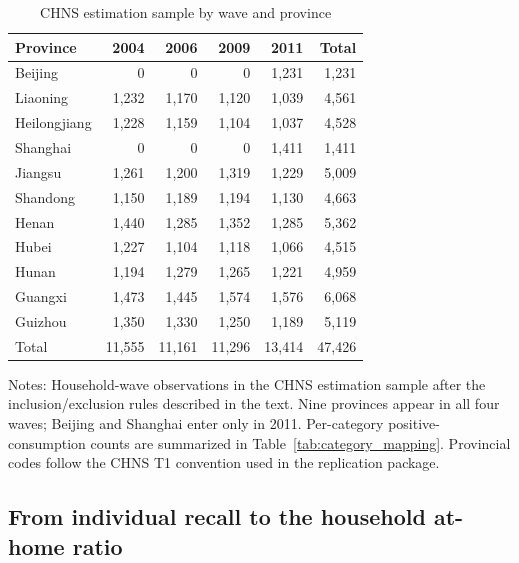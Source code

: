 \documentclass[preprint,12pt,authoryear]{elsarticle}
\begin{document}
\begin{table}[htbp]
\centering
\caption{CHNS estimation sample by wave and province}
\label{tab:sample}
\begin{threeparttable}
\begin{tabular*}{\textwidth}{@{\extracolsep{\fill}} lrrrrr @{}}
\toprule
Province & 2004 & 2006 & 2009 & 2011 & Total \\
\midrule
Beijing       &       0 &       0 &       0 &  1{,}231 &  1{,}231 \\
Liaoning      &  1{,}232 &  1{,}170 &  1{,}120 &  1{,}039 &  4{,}561 \\
Heilongjiang  &  1{,}228 &  1{,}159 &  1{,}104 &  1{,}037 &  4{,}528 \\
Shanghai      &       0 &       0 &       0 &  1{,}411 &  1{,}411 \\
Jiangsu       &  1{,}261 &  1{,}200 &  1{,}319 &  1{,}229 &  5{,}009 \\
Shandong      &  1{,}150 &  1{,}189 &  1{,}194 &  1{,}130 &  4{,}663 \\
Henan         &  1{,}440 &  1{,}285 &  1{,}352 &  1{,}285 &  5{,}362 \\
Hubei         &  1{,}227 &  1{,}104 &  1{,}118 &  1{,}066 &  4{,}515 \\
Hunan         &  1{,}194 &  1{,}279 &  1{,}265 &  1{,}221 &  4{,}959 \\
Guangxi       &  1{,}473 &  1{,}445 &  1{,}574 &  1{,}576 &  6{,}068 \\
Guizhou       &  1{,}350 &  1{,}330 &  1{,}250 &  1{,}189 &  5{,}119 \\
\midrule
Total         & 11{,}555 & 11{,}161 & 11{,}296 & 13{,}414 & 47{,}426 \\
\bottomrule
\end{tabular*}
\begin{tablenotes}[flushleft]
\scriptsize
\item Notes: Household-wave observations in the CHNS estimation sample after the inclusion/exclusion rules described in the text. Nine provinces appear in all four waves; Beijing and Shanghai enter only in 2011. Per-category positive-consumption counts are summarized in Table~\ref{tab:category_mapping}. Provincial codes follow the CHNS T1 convention used in the replication package.
\end{tablenotes}
\end{threeparttable}
\end{table}

\subsection{From individual recall to the household at-home ratio}
\end{document}
